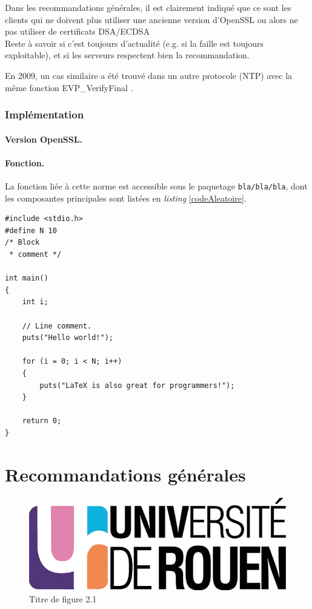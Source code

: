 		Dans les recommandations générales, il est clairement indiqué que ce sont 
		les clients qui ne doivent plus utiliser une ancienne version d'OpenSSL
		ou alors ne pas utiliser de certificats DSA/ECDSA\\
	
		Reste à savoir si c'est toujours d'actualité (e.g. si la faille est
		toujours exploitable), et si les serveurs respectent bien la
		recommandation.
	
		En 2009, un cas similaire a été trouvé dans un autre protocole 
		(NTP) avec la même fonction EVP\_VerifyFinal \cite{cve-2009-0021}.
		
		\subsubsection{Implémentation}
			
			\paragraph{Version OpenSSL.\\}
			
			\paragraph{Fonction.\\}
			La fonction liée à cette norme est accessible sous le paquetage
			\texttt{bla/bla/bla}, dont les composantes principales sont 
			listées en \textit{listing} \ref{codeAleatoire}.
		
		
		\begin{lstlisting}[style=customc,caption=codeAleatoire.c, label=codeAleatoire]
#include <stdio.h>
#define N 10
/* Block
 * comment */
 
int main()
{
    int i;
 
    // Line comment.
    puts("Hello world!");
 
    for (i = 0; i < N; i++)
    {
        puts("LaTeX is also great for programmers!");
    }
 
    return 0;
}
		\end{lstlisting}
		
		
		
		
		
	

\section{Recommandations générales}




\begin{figure}[H]
	\centering
	\includegraphics[scale=0.2]{images/logo_univ.png}
	\caption{Titre de figure 2.1}
	\label{fig21}
\end{figure}
